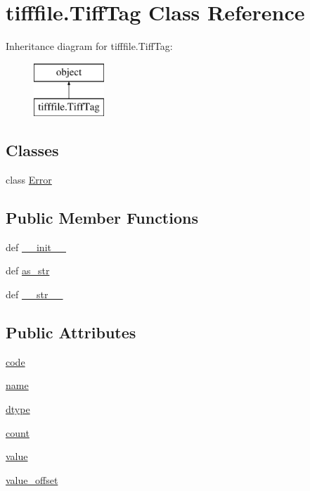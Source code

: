 \hypertarget{classtifffile_1_1_tiff_tag}{\section{tifffile.\-Tiff\-Tag Class Reference}
\label{classtifffile_1_1_tiff_tag}
}
Inheritance diagram for tifffile.\-Tiff\-Tag\-:\begin{figure}[H]
\begin{center}
\leavevmode
\includegraphics[height=2.000000cm]{classtifffile_1_1_tiff_tag}
\end{center}
\end{figure}
\subsection*{Classes}
\begin{DoxyCompactItemize}
\item 
class \hyperlink{classtifffile_1_1_tiff_tag_1_1_error}{Error}
\end{DoxyCompactItemize}
\subsection*{Public Member Functions}
\begin{DoxyCompactItemize}
\item 
def \hyperlink{classtifffile_1_1_tiff_tag_ace152e86d4dec367306b2aa8c966870a}{\-\_\-\-\_\-init\-\_\-\-\_\-}
\item 
def \hyperlink{classtifffile_1_1_tiff_tag_a6ee3a148b9b7d1233b30a011c0bbcecf}{as\-\_\-str}
\item 
def \hyperlink{classtifffile_1_1_tiff_tag_a3566254292688e9a17f1d71e1506c025}{\-\_\-\-\_\-str\-\_\-\-\_\-}
\end{DoxyCompactItemize}
\subsection*{Public Attributes}
\begin{DoxyCompactItemize}
\item 
\hyperlink{classtifffile_1_1_tiff_tag_a361450aec8540d6ae10e09a51cdd9bee}{code}
\item 
\hyperlink{classtifffile_1_1_tiff_tag_ac34a7b79c29ce864523c939668c5e4f7}{name}
\item 
\hyperlink{classtifffile_1_1_tiff_tag_a31e69f1557e2a9799fdddd2d461c4776}{dtype}
\item 
\hyperlink{classtifffile_1_1_tiff_tag_a20b7fd8e18b9c23e1e55a9bbdc00da3c}{count}
\item 
\hyperlink{classtifffile_1_1_tiff_tag_a0578d5c23f06bde73d1728eb8da3461b}{value}
\item 
\hyperlink{classtifffile_1_1_tiff_tag_ac86aee4a1ef18fc194e4f0c753f74002}{value\-\_\-offset}
\end{DoxyCompactItemize}


